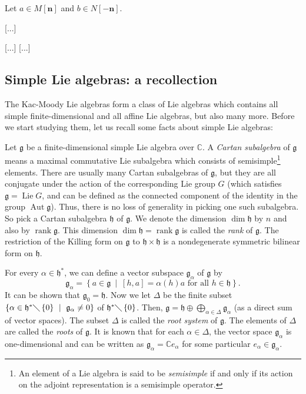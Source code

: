 \documentclass[etingof-lie.tex]{subfiles}
\begin{document}
\begin{noncompile}
[...]

Let $a\in M\left[  \mathbf{n}\right]  $ and $b\in N\left[  -\mathbf{n}\right]
$.

[...]

[...] [...]
\end{noncompile}

\subsection{Simple Lie algebras: a recollection}

The Kac-Moody Lie algebras form a class of Lie algebras which contains all
simple finite-dimensional and all affine Lie algebras, but also many more.
Before we start studying them, let us recall some facts about simple Lie algebras:

Let $\mathfrak{g}$ be a finite-dimensional simple Lie algebra over
$\mathbb{C}$. A \textit{Cartan subalgebra} of $\mathfrak{g}$ means a maximal
commutative Lie subalgebra which consists of semisimple\footnote{An element of
a Lie algebra is said to be \textit{semisimple} if and only if its action on
the adjoint representation is a semisimple operator.} elements. There are
usually many Cartan subalgebras of $\mathfrak{g}$, but they are all conjugate
under the action of the corresponding Lie group $G$ (which satisfies
$\mathfrak{g}=\operatorname*{Lie}G$, and can be defined as the connected
component of the identity in the group $\operatorname*{Aut}\mathfrak{g}$).
Thus, there is no loss of generality in picking one such subalgebra. So pick a
Cartan subalgebra $\mathfrak{h}$ of $\mathfrak{g}$. We denote the dimension
$\dim\mathfrak{h}$ by $n$ and also by $\operatorname*{rank}\mathfrak{g}$. This
dimension $\dim\mathfrak{h}=\operatorname*{rank}\mathfrak{g}$ is called the
\textit{rank} of $\mathfrak{g}$. The restriction of the Killing form on
$\mathfrak{g}$ to $\mathfrak{h}\times\mathfrak{h}$ is a nondegenerate
symmetric bilinear form on $\mathfrak{h}$.

For every $\alpha\in\mathfrak{h}^{\ast}$, we can define a vector subspace
$\mathfrak{g}_{\alpha}$ of $\mathfrak{g}$ by
\[
\mathfrak{g}_{\alpha}=\left\{  a\in\mathfrak{g}\ \mid\ \left[  h,a\right]
=\alpha\left(  h\right)  a\text{ for all }h\in\mathfrak{h}\right\}  .
\]
It can be shown that $\mathfrak{g}_{0}=\mathfrak{h}$. Now we let $\Delta$ be
the finite subset $\left\{  \alpha\in\mathfrak{h}^{\ast}\diagdown\left\{
0\right\}  \ \mid\ \mathfrak{g}_{\alpha}\neq0\right\}  $ of $\mathfrak{h}%
^{\ast}\diagdown\left\{  0\right\}  $. Then, $\mathfrak{g}=\mathfrak{h}%
\oplus\bigoplus\limits_{\alpha\in\Delta}\mathfrak{g}_{\alpha}$ (as a direct
sum of vector spaces). The subset $\Delta$ is called the \textit{root system}
of $\mathfrak{g}$. The elements of $\Delta$ are called the \textit{roots} of
$\mathfrak{g}$. It is known that for each $\alpha\in\Delta$, the vector space
$\mathfrak{g}_{\alpha}$ is one-dimensional and can be written as
$\mathfrak{g}_{\alpha}=\mathbb{C}e_{\alpha}$ for some particular $e_{\alpha
}\in\mathfrak{g}_{\alpha}$.
\end{document}

